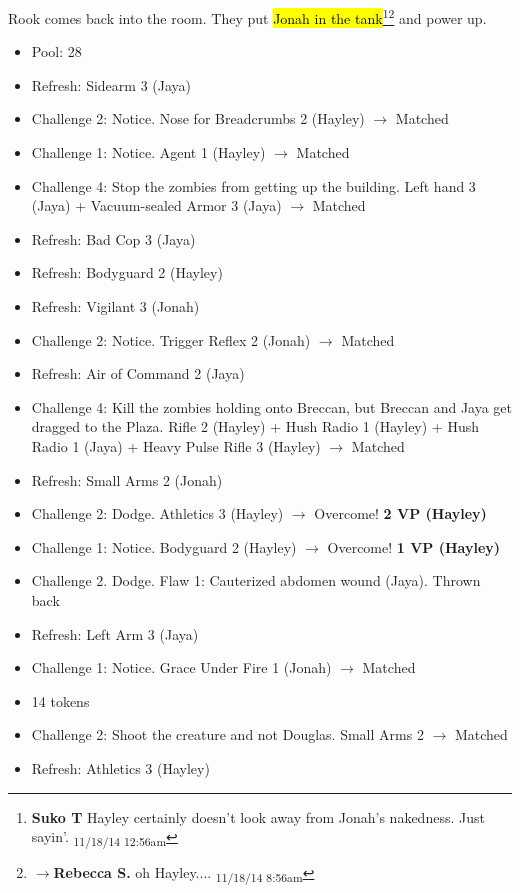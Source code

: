 Rook comes back into the room.  They put \hl{Jonah in the tank}\footnote{\textbf{Suko T }Hayley certainly doesn't look away from Jonah's nakedness.  Just sayin'. \textsubscript{11/18/14 12:56am}}\footnote{$\rightarrow$\textbf{Rebecca S. }oh Hayley.... \textsubscript{11/18/14 8:56am}} and power up.  





\begin{itemize}
\item Pool: 28
\item Refresh: Sidearm 3 (Jaya)
\item Challenge 2: Notice.  Nose for Breadcrumbs 2 (Hayley) $\rightarrow$ Matched
\item Challenge 1: Notice. Agent 1 (Hayley) $\rightarrow$ Matched
\item Challenge 4: Stop the zombies from getting up the building.  Left hand 3 (Jaya) + Vacuum-sealed Armor 3 (Jaya) $\rightarrow$ Matched
\item Refresh: Bad Cop 3 (Jaya)
\item Refresh: Bodyguard 2 (Hayley)
\item Refresh: Vigilant 3 (Jonah)
\item Challenge 2: Notice. Trigger Reflex 2 (Jonah) $\rightarrow$ Matched
\item Refresh: Air of Command 2 (Jaya)
\item Challenge 4: Kill the zombies holding onto Breccan, but Breccan and Jaya get dragged to the Plaza.  Rifle 2 (Hayley) + Hush Radio 1 (Hayley) + Hush Radio 1 (Jaya) + Heavy Pulse Rifle 3 (Hayley) $\rightarrow$ Matched
\item Refresh: Small Arms 2 (Jonah)
\item Challenge 2: Dodge.  Athletics 3 (Hayley) $\rightarrow$  Overcome! \textbf{2 VP (Hayley)}
\item Challenge 1: Notice.  Bodyguard 2 (Hayley) $\rightarrow$  Overcome! \textbf{1 VP (Hayley)}
\item Challenge 2. Dodge.   Flaw 1: Cauterized abdomen wound (Jaya).  Thrown back
\item Refresh: Left Arm 3 (Jaya)
\item Challenge 1: Notice.  Grace Under Fire 1 (Jonah) $\rightarrow$ Matched
\item 14 tokens
\item Challenge 2: Shoot the creature and not Douglas.  Small Arms 2 $\rightarrow$ Matched
\item Refresh: Athletics 3 (Hayley)

\end{itemize}
